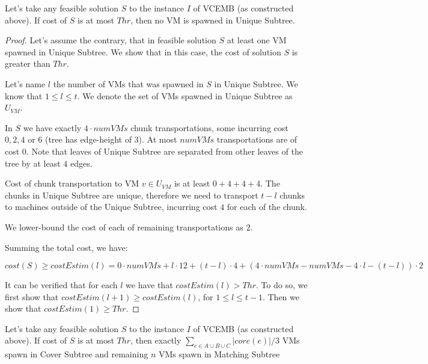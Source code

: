\begin{theorem}
  Let's take any feasible solution $S$ to the instance $I$ of VCEMB
  (as constructed above). If cost of $S$ is at most $Thr$, then no VM
  is spawned in Unique Subtree.
  \label{th:no-unique}
\end{theorem}

\begin{proof}
  Let's assume the contrary, that in feasible solution $S$ at least
  one VM spawned in Unique
  Subtree. We show that in this case, the cost of solution $S$ is
  greater than $Thr$. 

  Let's name $l$ the number of VMs that was spawned in $S$ in Unique
  Subtree. We know that $1 \leq l \leq t$. We denote the set of VMs
  spawned in Unique Subtree as $U_{VM}$.

In $S$ we have exactly
  $4 \cdot numVMs$ chunk transportations, some incurring cost $0, 2,
  4$ or $6$ (tree has edge-height of $3$). At most $numVMs$
  transportations are of cost $0$. Note that leaves of Unique Subtree
  are separated from other leaves of the tree by at least $4$ edges. 

  Cost of chunk transportation to VM $v \in U_{VM}$ is at least $0 + 4
  + 4 + 4$. The chunks in Unique Subtree are unique, therefore we need
  to transport $t - l$ chunks to machines outside of the Unique
  Subtree, incurring cost $4$ for each of the chunk.

  We lower-bound the cost of each of remaining transportations as $2$.

Summing the total cost, we have:

$cost(S) \geq costEstim(l) = 0 \cdot numVMs + l \cdot 12 + (t-l)\cdot 4 +
(4\cdot numVMs - numVMs - 4\cdot l - (t-l))\cdot 2$

It can be verified that for each $l$ we have that $costEstim(l) > Thr$. To
do so, we first show that $costEstim(l+1) \geq costEstim(l)$, for
$1\leq l \leq t-1$. Then we show that $costEstim(1) \geq Thr$.
\end{proof}

\begin{theorem}
  Let's take any feasible solution $S$ to the instance $I$ of VCEMB
  (as constructed above). If cost of $S$ is at most $Thr$, then
  exactly $\sum_{e\in A\cup B\cup C}|core(e)|/3$ VMs spawn in Cover
  Subtree and remaining $n$ VMs spawn in Matching Subtree
\end{theorem}

